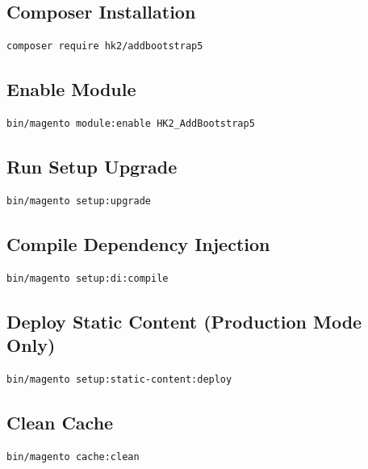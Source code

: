 \documentclass[11pt,a4paper]{article}
\begin{document}
\subsection{Composer Installation}

\begin{lstlisting}[style=shell]
composer require hk2/addbootstrap5
\end{lstlisting}

\subsection{Enable Module}

\begin{lstlisting}[style=shell]
bin/magento module:enable HK2_AddBootstrap5
\end{lstlisting}

\subsection{Run Setup Upgrade}

\begin{lstlisting}[style=shell]
bin/magento setup:upgrade
\end{lstlisting}

\subsection{Compile Dependency Injection}

\begin{lstlisting}[style=shell]
bin/magento setup:di:compile
\end{lstlisting}

\subsection{Deploy Static Content (Production Mode Only)}

\begin{lstlisting}[style=shell]
bin/magento setup:static-content:deploy
\end{lstlisting}

\subsection{Clean Cache}

\begin{lstlisting}[style=shell]
bin/magento cache:clean
\end{lstlisting}
\end{document}
